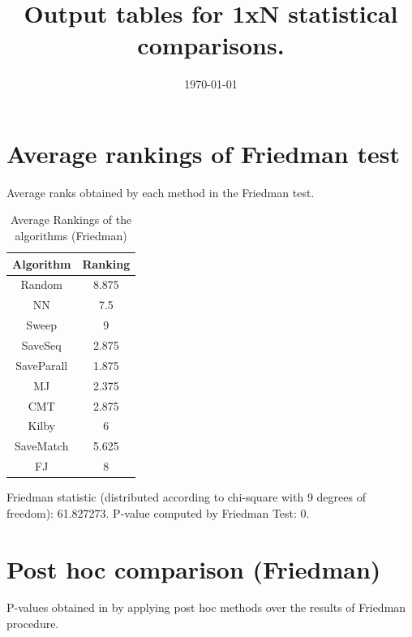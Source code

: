 \documentclass[a4paper,10pt]{article}
\title{Output tables for 1xN statistical comparisons.}
\author{}
\date{\today}
\begin{document}
\begin{landscape}
\pagestyle{empty}
\maketitle
\thispagestyle{empty}

\section{Average rankings of Friedman test}


Average ranks obtained by each method in the Friedman test.

\begin{table}[!htp]
\centering
\begin{tabular}{|c|c|}\hline
Algorithm&Ranking\\\hline
Random&8.875\\NN&7.5\\Sweep&9\\SaveSeq&2.875\\SaveParall&1.875\\MJ&2.375\\CMT&2.875\\Kilby&6\\SaveMatch&5.625\\FJ&8\\\hline\end{tabular}
\caption{Average Rankings of the algorithms (Friedman)}
\end{table}

Friedman statistic (distributed according to chi-square with 9 degrees of freedom): 61.827273. \newline P-value computed by Friedman Test: 0.\newline


\newpage

\section{Post hoc comparison (Friedman)}


P-values obtained in by applying post hoc methods over the results of Friedman procedure.


\end{landscape}
\end{document}
